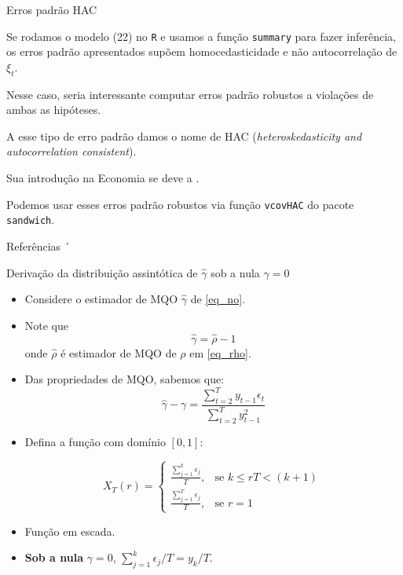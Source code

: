 \documentclass[11pt]{beamer}
\newenvironment{halfwideitemize}{\itemize\addtolength{\itemsep}{0.5em}}{\enditemize}
\begin{document}
\begin{frame}{Erros padrão HAC}
	\begin{halfwideitemize}
		\item Se rodamos o modelo (22) no \texttt{R} e usamos a função \texttt{summary} para fazer inferência, os erros padrão apresentados supõem homocedasticidade e não autocorrelação de $\xi_t$.
		\item Nesse caso, seria interessante computar erros padrão robustos a violações de ambas as hipóteses.
		\begin{halfwideitemize}
			\item A esse tipo de erro padrão damos o nome de HAC (\textit{heteroskedasticity and autocorrelation consistent}).
			\item Sua introdução na Economia se deve a \citet{Newey1987}.
		\end{halfwideitemize}
		\item Podemos usar esses erros padrão robustos via função \texttt{vcovHAC} do pacote \texttt{sandwich}.
	\end{halfwideitemize}
\end{frame}

\begin{frame}[allowframebreaks]{Referências}
	\printbibliography´
\end{frame}

\appendix
\begin{frame}{Derivação da distribuição assintótica de $\hat{\gamma}$ sob a nula $\gamma = 0$ }
	\label{app_donsker}
	
	\begin{itemize}
		\item Considere o estimador de MQO $\hat{\gamma}$ de \eqref{eq_no}.
		\item Note que
		$$\hat{\gamma} = \hat{\rho} - 1$$
		onde $\hat{\rho}$ é estimador de MQO de $\rho$ em \eqref{eq_rho}.
		\item Das propriedades de MQO, sabemos que:
		$$\hat{\gamma} -  \gamma = \frac{\sum_{t=2}^T y_{t-1}\epsilon_t}{\sum_{t=2}^T y_{t-1}^2}$$
		\item Defina a função com domínio $[0,1]$:
		
		$$X_T(r) = \begin{cases}
						\frac{\sum_{j=1}^{k}\epsilon_j}{T},& \text{se } k\leq r T <  (k+1)\, \\
						\frac{\sum_{j=1}^{T}\epsilon_j}{T}, & \text{se } r = 1
		\end{cases}$$

		\item Função em escada.
		\item \textbf{Sob a nula} $\gamma = 0$, $\sum_{j=1}^{k}\epsilon_j/T=  y_k/T$.
	\end{itemize}
\end{frame}
\end{document}
